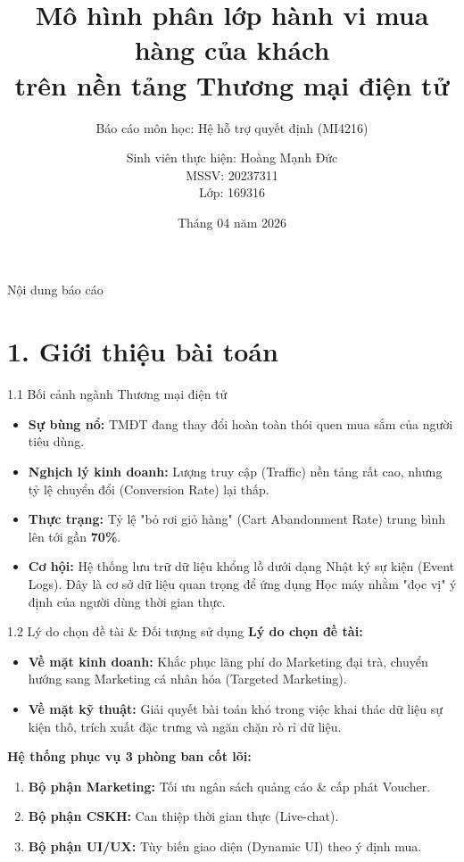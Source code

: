 \documentclass[aspectratio=169, 11pt]{beamer}
\title[Dự đoán ý định mua hàng TMĐT]{Mô hình phân lớp hành vi mua hàng của khách \\ trên nền tảng Thương mại điện tử}
\subtitle{Báo cáo môn học: Hệ hỗ trợ quyết định (MI4216)}
\author[Hoàng Mạnh Đức]{Sinh viên thực hiện: Hoàng Mạnh Đức \\ MSSV: 20237311 \\ Lớp: 169316}
\institute[ĐHBK HN]{Trường Đại học Bách Khoa Hà Nội \\ Khoa Toán - Tin}
\date{Tháng 04 năm 2026}
\begin{document}
\begin{frame}
    \titlepage
\end{frame}

\begin{frame}{Nội dung báo cáo}
    \tableofcontents
\end{frame}

\section{1. Giới thiệu bài toán}

\begin{frame}{1.1 Bối cảnh ngành Thương mại điện tử}
    \begin{itemize}
        \item \textbf{Sự bùng nổ:} TMĐT đang thay đổi hoàn toàn thói quen mua sắm của người tiêu dùng.
        \vspace{0.3cm}
        \item \textbf{Nghịch lý kinh doanh:} Lượng truy cập (Traffic) nền tảng rất cao, nhưng tỷ lệ chuyển đổi (Conversion Rate) lại thấp. 
        \vspace{0.3cm}
        \item \textbf{Thực trạng:} Tỷ lệ "bỏ rơi giỏ hàng" (Cart Abandonment Rate) trung bình lên tới gần \textbf{70\%}.
        \vspace{0.3cm}
        \item \textbf{Cơ hội:} Hệ thống lưu trữ dữ liệu khổng lồ dưới dạng Nhật ký sự kiện (Event Logs). Đây là cơ sở dữ liệu quan trọng để ứng dụng Học máy nhằm "đọc vị" ý định của người dùng thời gian thực.
    \end{itemize}
\end{frame}

\begin{frame}{1.2 Lý do chọn đề tài \& Đối tượng sử dụng}
    \textbf{Lý do chọn đề tài:}
    \begin{itemize}
        \item \textbf{Về mặt kinh doanh:} Khắc phục lãng phí do Marketing đại trà, chuyển hướng sang Marketing cá nhân hóa (Targeted Marketing).
        \item \textbf{Về mặt kỹ thuật:} Giải quyết bài toán khó trong việc khai thác dữ liệu sự kiện thô, trích xuất đặc trưng và ngăn chặn rò rỉ dữ liệu.
    \end{itemize}
    
    \vspace{0.5cm}
    \textbf{Hệ thống phục vụ 3 phòng ban cốt lõi:}
    \begin{enumerate}
        \item \textbf{Bộ phận Marketing:} Tối ưu ngân sách quảng cáo \& cấp phát Voucher.
        \item \textbf{Bộ phận CSKH:} Can thiệp thời gian thực (Live-chat).
        \item \textbf{Bộ phận UI/UX:} Tùy biến giao diện (Dynamic UI) theo ý định mua.
    \end{enumerate}
\end{frame}
\end{document}
